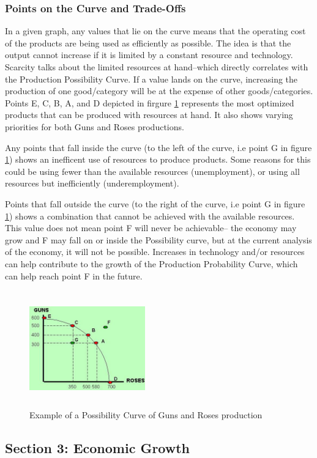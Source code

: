 \documentclass[a4paper, 12pt] {article}
\begin{document}
\subsubsection{Points on the Curve and Trade-Offs}
In a given graph, any values that lie on the curve means that the operating cost
of the products are being used as efficiently as possible. The idea is that the
output cannot increase if it is limited by a constant resource and technology.
Scarcity talks about the limited resources at hand--which directly correlates
with the Production Possibility Curve. If a value lands on the curve, increasing
the production of one good/category will be at the expense of other goods/categories.
Points E, C, B, A, and D depicted in firgure \ref{fig:GnR1} represents the most
optimized products that can be produced with resources at hand. It also shows
varying priorities for both Guns and Roses productions.

Any points that fall inside the curve (to the left of the curve, i.e point G in
figure \ref{fig:GnR1}) shows an inefficent use of resources to produce products.
Some reasons for this could be using fewer than the available resources
(unemployment), or using all resources but inefficiently (underemployment).

Points that fall outside the curve (to the right of the curve, i.e point G in
figure \ref{fig:GnR1}) shows a combination that cannot be achieved with the
available resources. This value does not mean point F will never be achievable--
the economy may grow and F may fall on or inside the Possibility curve, but at
the current analysis of the economy, it will not be possible.
Increases in technology and/or resources can help contribute to the growth of
the Production Probability Curve, which can help reach point F in the future.

\begin{figure}[h]
    \centering
    \includegraphics[width=5cm, height=5cm]{Production_Possibility_Curve.jpg}
    \caption{Example of a Possibility Curve of Guns and Roses production}
    \label{fig:GnR1}
\end{figure}

\subsection{Section 3: Economic Growth}
\end{document}
